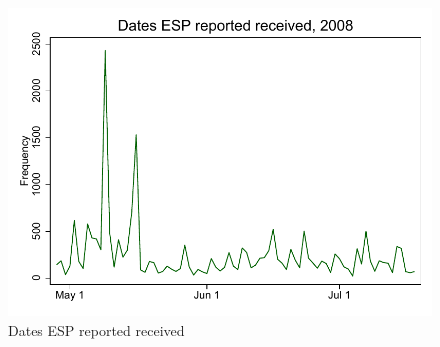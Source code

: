 \documentclass[12pt]{article}
\begin{document}

\singlespacing



\clearpage


\clearpage


\clearpage


\clearpage


\clearpage



\clearpage
\begin{figure}[t]
\begin{center}
\caption{Dates ESP reported received}
\label{ts_esp}
\includegraphics[width=1\textwidth, angle=0]{../figures/ts_esp.pdf}
\footnotesize
\end{center}
\end{figure}
\end{document}
